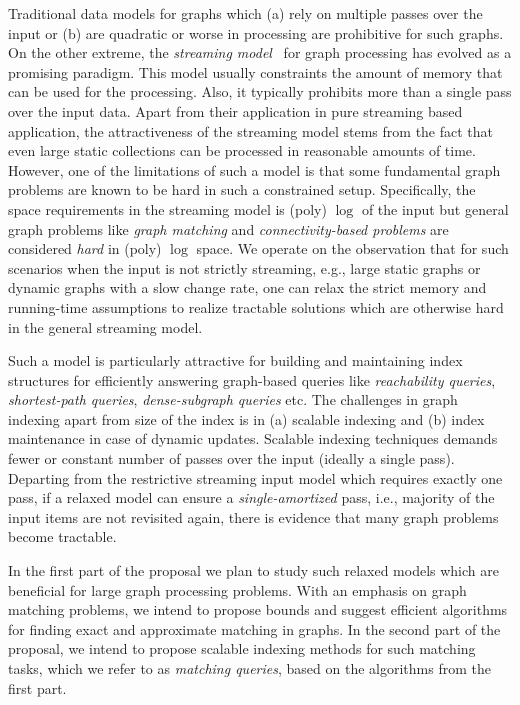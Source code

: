 \documentclass{scrartcl}
\begin{document}
Traditional data models for graphs which (a) rely on multiple passes over the input or (b) are quadratic or worse in processing are prohibitive for such graphs. On the other extreme, the \emph{streaming model}~\cite{Henzinger,Feigenbaum, Alon} for graph processing has evolved as a promising paradigm. This model usually constraints the amount of memory that can be used for the processing. Also, it typically prohibits more than a single pass over the input data. Apart from their application in pure streaming based application, the attractiveness of the streaming model stems from the fact that even large static collections can be processed in reasonable amounts of time. However, one of the limitations of such a model is that some fundamental graph problems are known to be hard in such a constrained setup. Specifically, the space requirements in the streaming model is (poly) $\log$ of the input but general graph problems like \emph{graph matching} and \emph{connectivity-based problems} are considered \emph{hard} in (poly) $\log$ space. We operate on the observation that for such scenarios when the input is not strictly streaming, e.g., large static graphs or dynamic graphs with a slow change rate, one can relax the strict memory and running-time assumptions to realize tractable solutions which are otherwise hard in the general streaming model.

Such a model is particularly attractive for building and maintaining index structures for efficiently answering graph-based queries like \emph{reachability queries}, \emph{shortest-path queries}, \emph{dense-subgraph queries} etc. The challenges in graph indexing apart from size of the index is in (a) scalable indexing and (b) index maintenance in case of dynamic updates. Scalable indexing techniques demands fewer or constant number of passes over the input (ideally a single pass). Departing from the restrictive streaming input model which requires exactly one pass, if a relaxed model can ensure a \emph{single-amortized} pass, i.e., majority of the input items are not revisited again, there is evidence that many graph problems become tractable. 

In the first part of the proposal we plan to study such relaxed models which are beneficial for large graph processing problems. With an emphasis on graph matching problems, we intend to propose bounds and suggest efficient algorithms for finding exact and approximate matching in graphs. In the second part of the proposal, we intend to propose scalable indexing methods for such matching tasks, which we refer to as \emph{matching queries}, based on the algorithms from the first part.
\end{document}
